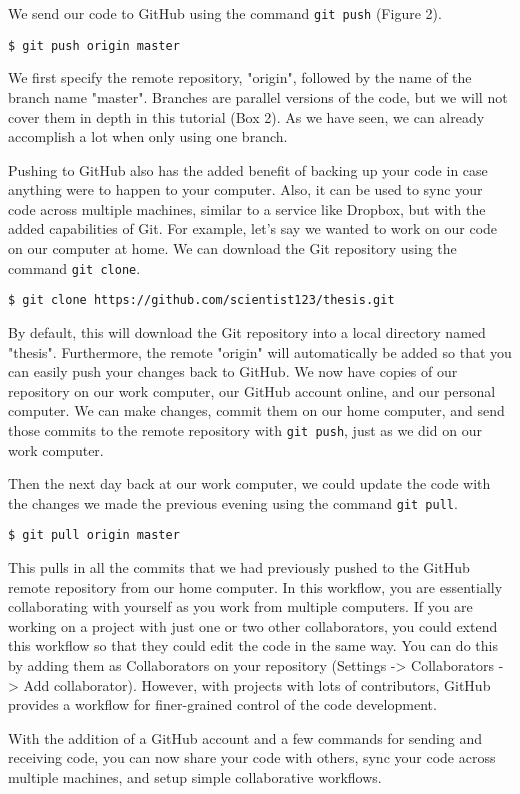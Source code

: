 We send our code to GitHub using the command \verb|git push| (Figure 2).

\begin{lstlisting}
$ git push origin master
\end{lstlisting}

We first specify the remote repository, "origin", followed by the name of the branch name "master".
Branches are parallel versions of the code, but we will not cover them in depth in this tutorial (Box 2).
As we have seen, we can already accomplish a lot when only using one branch.

Pushing to GitHub also has the added benefit of backing up your code in case anything were to happen to your computer.
Also, it can be used to sync your code across multiple machines, similar to a service like Dropbox, but with the added capabilities of Git.
For example, let's say we wanted to work on our code on our computer at home.
We can download the Git repository using the command \verb|git clone|.

\begin{lstlisting}
$ git clone https://github.com/scientist123/thesis.git
\end{lstlisting}

By default, this will download the Git repository into a local directory named "thesis".
Furthermore, the remote "origin" will automatically be added so that you can easily push your changes back to GitHub.
We now have copies of our repository on our work computer, our GitHub account online, and our personal computer.
We can make changes, commit them on our home computer, and send those commits to the remote repository with \verb|git push|, just as we did on our work computer.

Then the next day back at our work computer, we could update the code with the changes we made the previous evening using the command \verb|git pull|.

\begin{lstlisting}
$ git pull origin master
\end{lstlisting}

This pulls in all the commits that we had previously pushed to the GitHub remote repository from our home computer.
In this workflow, you are essentially collaborating with yourself as you work from multiple computers.
If you are working on a project with just one or two other collaborators, you could extend this workflow so that they could edit the code in the same way.
You can do this by adding them as Collaborators on your repository (Settings -> Collaborators -> Add collaborator).
However, with projects with lots of contributors, GitHub provides a workflow for finer-grained control of the code development.

With the addition of a GitHub account and a few commands for sending and receiving code, you can now share your code with others, sync your code across multiple machines, and setup simple collaborative workflows.